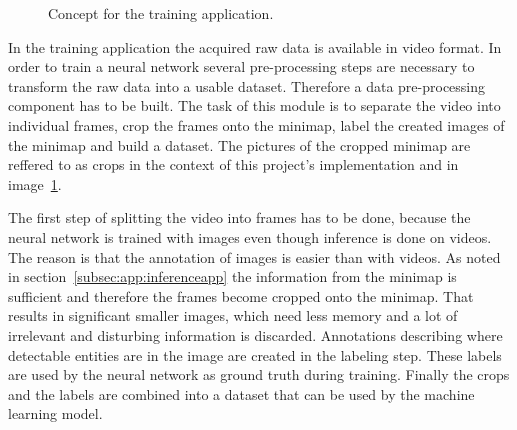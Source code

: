 \begin{figure}
	\caption{Concept for the training application.}
	\label{fig:app:conceptTrain}
\end{figure}

In the training application the acquired raw data is available in video format. In order to train a neural 
network several pre-processing steps are necessary to transform the raw data into a usable dataset. 
Therefore a data pre-processing component has to be built. The task of this module is to separate 
the video into individual frames, crop the frames onto the minimap, label the created images of the 
minimap and build a dataset. The pictures of the cropped minimap are reffered to as crops in the 
context of this project's implementation and in image~\ref{fig:app:conceptTrain}.

The first step of splitting the video into frames has to be done, because the neural network is 
trained with images even though inference is done on videos. The reason is that the annotation of 
images is easier than with videos. As noted in section~\ref{subsec:app:inferenceapp} the information 
from the minimap is sufficient and therefore the frames become cropped onto the minimap. That 
results in significant smaller images, which need less memory and a lot of irrelevant and disturbing 
information is discarded. Annotations describing where detectable entities are in the image are 
created in the labeling step. These labels are used by the neural network as ground truth 
during training. Finally the crops and the labels are combined into a dataset that can be used by the 
machine learning model.

